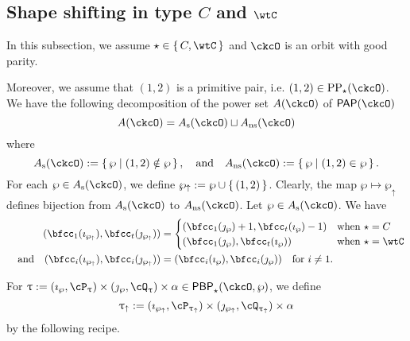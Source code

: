 \documentclass[12pt,a4paper]{amsart}
\def\Ass{A_{\mathrm{s}}}
\def\Ans{A_{\mathrm{ns}}}
\def\wpu{\wp_{\uparrow}}
\def\wpd{\wp} %
\def\uptauu{\uptau_{\uparrow}}
\def\PPm{\wp_{\downarrow}}
\numberwithin{equation}{section}
\theoremstyle{remark}
\def\PP{\mathsf{PAP}}
\def\AND{\quad \text{and} \quad}
\def\CPPs{\mathrm{PP}_{\star}}
\def\PBP{\mathsf{PBP}}
\def\PBPop#1#2#3#4{\PBP_{#1}^{#2}(#3,#4)}
\newcommand{\PBPOP}[1][]{\PBPop{\star}{#1}{\ckcO}{\wp}}
\begin{document}
 \subsection{Shape shifting in type $C$ and $\wtC$}
 In this subsection, we assume $\star \in \set{C,\wtC}$ and $\ckcO$ is an orbit
 with good parity.



 Moreover, we assume that $(1,2)$ is a primitive pair, i.e.
 $(1,2)\in \CPPs(\ckcO)$. We have the following decomposition of the power set
 $A(\ckcO)$ of $\PP(\ckcO)$
 \[
   A(\ckcO) = \Ass(\ckcO) \sqcup \Ans(\ckcO)
 \]
 where
 \[
 \Ass(\ckcO): = \set{\wp | (1,2)\notin \wp}, \AND
 \Ans(\ckcO): = \set{\wp | (1,2)\in \wp}.
 \]
 For each $\wp\in \Ass(\ckcO)$, we
 define $\wp_{\uparrow}:= \wp\cup \set{(1,2)}$. Clearly, the map
 $\wp \mapsto \wp_{\uparrow}$ defines bijection from $\Ass(\ckcO)$ to
 $\Ans(\ckcO)$.
 Let $\wp\in \Ass(\ckcO)$. We have
  \[
    \begin{split}
      (\bfcc_{1}(\imath_{\wpu}), \bfcc_{t}(\jmath_{\wpu})) &=
      \begin{cases}
        (\bfcc_{1}(\jmath_{\wpd})+1, \bfcc_{t}(\imath_{\wpd})-1) & \text{when
        } \star = C\\
        (\bfcc_{1}(\jmath_{\wpd}), \bfcc_{t}(\imath_{\wpd}))& \text{when
        } \star = \wtC\\
      \end{cases}
      \\
      \AND
      (\bfcc_{i}(\imath_{\wpu}),\bfcc_{i}(\jmath_{\wpu})) &=(\bfcc_{i}(\imath_{\wpd}),\bfcc_{i}(\jmath_{\wpd}))\quad \text{for $i\neq 1$}.
    \end{split}
  \]

 For
 $\uptau := (\imath_{\wp},\cP_{\uptau})\times (\jmath_{\wp},\cQ_{\uptau})\times \alpha \in \PBPOP $,
 we
 define
 \[
   \uptauu:= (\imath_{\wpu}, \cP_{\uptauu})\times (\jmath_{\wpu},\cQ_{\uptauu})\times \alpha
 \]
 by the following recipe.
\end{document}

